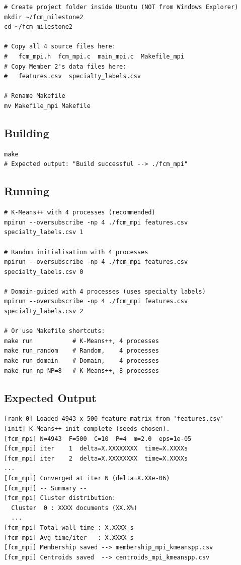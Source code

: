 \documentclass[12pt,a4paper]{article}
\begin{document}
\begin{lstlisting}[style=bashstyle, caption={Setting up the project directory}]
# Create project folder inside Ubuntu (NOT from Windows Explorer)
mkdir ~/fcm_milestone2
cd ~/fcm_milestone2

# Copy all 4 source files here:
#   fcm_mpi.h  fcm_mpi.c  main_mpi.c  Makefile_mpi
# Copy Member 2's data files here:
#   features.csv  specialty_labels.csv

# Rename Makefile
mv Makefile_mpi Makefile
\end{lstlisting}

\subsection{Building}

\begin{lstlisting}[style=bashstyle, caption={Build the parallel FCM executable}]
make
# Expected output: "Build successful --> ./fcm_mpi"
\end{lstlisting}

\subsection{Running}

\begin{lstlisting}[style=bashstyle, caption={Running with different process counts and strategies}]
# K-Means++ with 4 processes (recommended)
mpirun --oversubscribe -np 4 ./fcm_mpi features.csv specialty_labels.csv 1

# Random initialisation with 4 processes
mpirun --oversubscribe -np 4 ./fcm_mpi features.csv specialty_labels.csv 0

# Domain-guided with 4 processes (uses specialty labels)
mpirun --oversubscribe -np 4 ./fcm_mpi features.csv specialty_labels.csv 2

# Or use Makefile shortcuts:
make run           # K-Means++, 4 processes
make run_random    # Random,    4 processes
make run_domain    # Domain,    4 processes
make run_np NP=8   # K-Means++, 8 processes
\end{lstlisting}

\subsection{Expected Output}

\begin{lstlisting}[style=bashstyle, caption={Expected terminal output when running}]
[rank 0] Loaded 4943 x 500 feature matrix from 'features.csv'
[init] K-Means++ init complete (seeds chosen).
[fcm_mpi] N=4943  F=500  C=10  P=4  m=2.0  eps=1e-05
[fcm_mpi] iter    1  delta=X.XXXXXXXX  time=X.XXXXs
[fcm_mpi] iter    2  delta=X.XXXXXXXX  time=X.XXXXs
...
[fcm_mpi] Converged at iter N (delta=X.XXe-06)
[fcm_mpi] -- Summary --
[fcm_mpi] Cluster distribution:
  Cluster  0 : XXXX documents (XX.X%)
  ...
[fcm_mpi] Total wall time : X.XXXX s
[fcm_mpi] Avg time/iter   : X.XXXX s
[fcm_mpi] Membership saved --> membership_mpi_kmeanspp.csv
[fcm_mpi] Centroids saved  --> centroids_mpi_kmeanspp.csv
\end{lstlisting}
\end{document}
